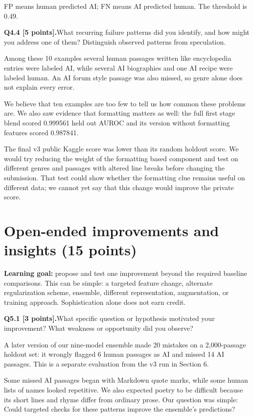 \documentclass[11pt,letterpaper]{article}
\newcommand{\question}[2]{\needspace{4\baselineskip}\par\addvspace{0.45em}\noindent\textbf{#1}\quad #2\par\nobreak\vspace{0.1em}}
\newcommand{\smallnote}[1]{{\small\color{muted}#1}}
\begin{document}
\smallnote{FP means human predicted AI; FN means AI predicted human. The threshold is 0.49.}
\question{Q4.4 [5 points].}{What recurring failure patterns did you identify, and how might you address one of them? Distinguish observed patterns from speculation.}
Among these 10 examples several human passages written like encyclopedia entries were labeled AI, while several AI biographies and one AI recipe were labeled human. An AI forum style passage was also missed, so genre alone does not explain every error.
\newline

We believe that ten examples are too few to tell us how common these problems are. We also saw evidence that formatting matters as well: the full first stage blend scored 0.999561 held out AUROC and its version without formatting features scored 0.987841.
\newline

The final v3 public Kaggle score was lower than its random holdout score. We would try reducing the weight of the formatting based component and test on different genres and passages with altered line breaks before changing the submission. That test could show whether the formatting clue remains useful on different data; we cannot yet say that this change would improve the private score.
\newpage
\section{Open-ended improvements and insights (15 points)}
\textbf{Learning goal:} propose and test one improvement beyond the required baseline comparisons. This can be simple: a targeted feature change, alternate regularization scheme, ensemble, different representation, augmentation, or training approach. Sophistication alone does not earn credit.

\question{Q5.1 [3 points].}{What specific question or hypothesis motivated your improvement? What weakness or opportunity did you observe?}
A later version of our nine-model ensemble made 20 mistakes on a 2,000-passage holdout set: it wrongly flagged 6 human passages as AI and missed 14 AI passages. This is a separate evaluation from the v3 run in Section 6.
\newline

Some missed AI passages began with Markdown quote marks, while some human lists of names looked repetitive. We also expected poetry to be difficult because its short lines and rhyme differ from ordinary prose. Our question was simple: Could targeted checks for these patterns improve the ensemble's predictions?
\end{document}
